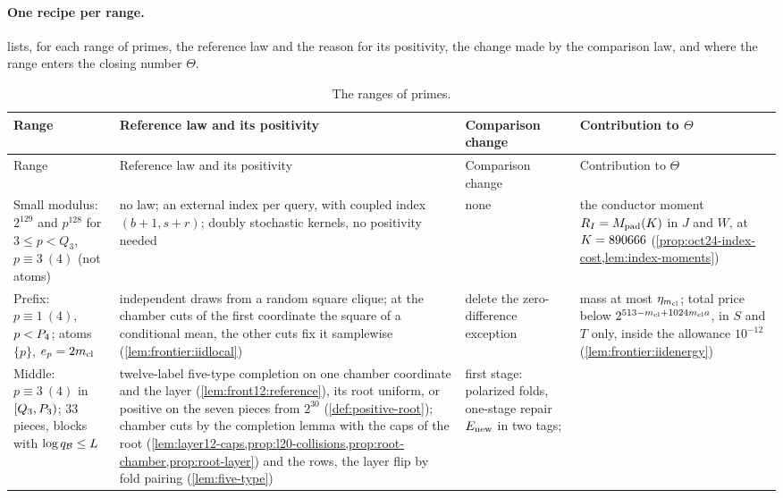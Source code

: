 \paragraph{One recipe per range.}
 lists, for each range of primes, the reference law and the
reason for its positivity, the change made by the comparison law, and where
the range enters the closing number $\Theta$.

{\small
\setlength{\LTpre}{6pt}\setlength{\LTpost}{6pt}
\begin{longtable}{@{}>{\raggedright\arraybackslash}p{2.55cm}%
>{\raggedright\arraybackslash}p{4.55cm}%
>{\raggedright\arraybackslash}p{3.3cm}%
>{\raggedright\arraybackslash}p{4.25cm}@{}}
\caption{The ranges of primes.}\label{tab:ranges}\\
\toprule
Range & Reference law and its positivity & Comparison change & Contribution to $\Theta$\\
\midrule
\endfirsthead
\toprule
Range & Reference law and its positivity & Comparison change & Contribution to $\Theta$\\
\midrule
\endhead
\bottomrule
\endfoot
Small modulus: $2^{129}$ and $p^{128}$ for $3\le p<Q_3$, $p\equiv3\ (4)$ (not atoms)
& no law; an external index per query, with coupled index $(b+1,s+r)$;
 doubly stochastic kernels, no positivity needed
& none
& the conductor moment $R_I=M_{\rm pad}(K)$ in $J$ and $W$, at $K=890666$
 (\cref{prop:oct24-index-cost,lem:index-moments})\\
\addlinespace
Prefix: $p\equiv1\ (4)$, $p<P_4$; atoms $\{p\}$, $e_p=2m_{\mathrm{cl}}$
& independent draws from a random square clique; at the chamber
 cuts of the first coordinate the square of a conditional mean,
 the other cuts fix it samplewise
 (\cref{lem:frontier:iidlocal})
& delete the zero-difference exception
& mass at most $\eta_{m_{\mathrm{cl}}}$; total price below $2^{513-m_{\mathrm{cl}}+1024m_{\mathrm{cl}} a}$, in
 $S$ and $T$ only, inside the allowance $10^{-12}$
 (\cref{lem:frontier:iidenergy})\\
\addlinespace
Middle: $p\equiv3\ (4)$ in $[Q_3,P_3)$; $33$ pieces, blocks with
 $\log q_{\mathcal B}\le L$
& twelve-label five-type completion on one chamber coordinate and the layer
 (\cref{lem:front12:reference}), its root uniform, or positive on the seven
 pieces from $2^{30}$ (\cref{def:positive-root}); chamber cuts by the
 completion lemma with the caps of the root
 (\cref{lem:layer12-caps,prop:l20-collisions,prop:root-chamber,prop:root-layer})
 and the rows, the layer flip by fold pairing (\cref{lem:five-type})
& first stage: polarized folds, one-stage repair $E_{\rm new}$ in two tags;

\end{longtable}}
